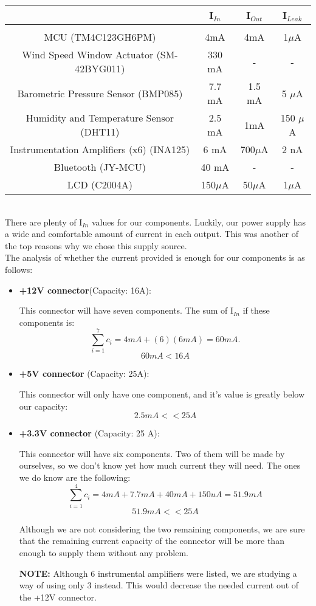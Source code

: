 			\begin{tabular}{|c|c|c|c|}
				\hline
				& I$_{In}$ &  I$_{Out}$ & I$_{Leak}$\\
				\hline
				& & &   \\
				MCU (TM4C123GH6PM) & 4mA & 4mA & 1$\mu$A  \\
				Wind Speed Window Actuator (SM-42BYG011) & 330 mA & - & -\\
				Barometric Pressure Sensor (BMP085) & 7.7 mA  & 1.5 mA & 5 $\mu$A \\
				Humidity and Temperature Sensor (DHT11) & 2.5 mA & 1mA & 150 $\mu$A \\
				Instrumentation Amplifiers (x6) (INA125) & 6 mA &  700$\mu$A & 2 nA  \\
				Bluetooth (JY-MCU) & 40 mA & - & - \\
				LCD (C2004A) & 150$\mu$A & 50$\mu$A & 1$\mu$A \\
				\hline
			\end{tabular} \\ 

			There are plenty of I$_{In}$ values for our components. Luckily, our power supply has a wide and comfortable amount of current in each output. This was another of the top reasons why we chose this supply source. \\

			The analysis of whether the current provided is enough for our components is as follows:

			\begin{itemize}
			  \item \textbf{+12V connector}(Capacity: 16A):
			  
			  This connector will have seven components. The sum of I$_{In}$ if these components is: $$ \sum_{i=1}^{7} c_i = 4mA + (6)(6mA) = 60mA. $$ $$60 mA < 16A $$ 
			  \item \textbf{+5V connector} (Capacity: 25A):
			  
			  This connector will only have one component, and it's value is greatly below our capacity: $$2.5 mA << 25A $$ 
			  
			  \item \textbf{+3.3V connector} (Capacity: 25 A):
			  
			  This connector will have six components. Two of them will be made by ourselves, so we don't know yet how much current they will need. The ones we do know are the following: $$\sum_{i=1}^{4} c_i = 4mA + 7.7 mA + 40 mA + 150 uA = 51.9 mA $$  $$51.9mA << 25A$$
			  
			  Although we are not considering the two remaining components, we are sure that the remaining current capacity of the connector will be more than enough to supply them without any problem.
			  
			  \textbf{NOTE:} Although 6 instrumental amplifiers were listed, we are studying a way of using only 3 instead. This would decrease the needed current out of the +12V connector.
			\end{itemize} 



